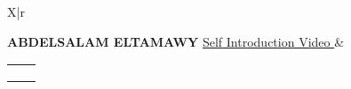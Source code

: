 \documentclass{resume}
\begin{document}
\begin{tabularx}{\textwidth}{X|r}
	
	{\LARGE\MakeUppercase{\bf Abdelsalam ElTamawy}}
	{\small\href{https://www.youtube.com/watch?v=8wwv_bj3Hvc}{Self Introduction Video \iconin{\faYoutubePlay}}}
	&
	\small{
		\begin{tabular}{ll}
			\href{mailto:solomspd@aucegypt.edu}{\iconanot{\faEnvelope}{solomspd@aucegypt.edu}} & \href{tel:+0201003435365}{\iconanot{\faPhone}{(+02)01003435365}} \\
			\href{https://github.com/solomspd}{\iconanot{\faGithub}{github.com/solomspd}} & \iconanot{\faMapMarker}{Nasr City, Cairo, Egypt} \\
			\multicolumn{2}{l}{\href{https://linkedin.com/in/abdelsalam-et}{\iconanot{\faLinkedin}{linkedin.com/in/abdelsalam-et}}} \\
		\end{tabular}
	}
\end{tabularx}

\end{document}
